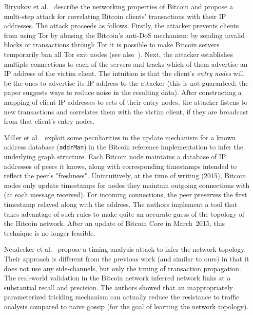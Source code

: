 Biryukov et al.~\cite{Biryukov2014} describe the networking properties of Bitcoin and propose a multi-step attack for correlating Bitcoin clients' transactions with their IP addresses.
The attack proceeds as follows.
Firstly, the attacker prevents clients from using Tor by abusing the Bitcoin's anti-DoS mechanism: by sending invalid blocks or transactions through Tor it is possible to make Bitcoin servers temporarily ban all Tor exit nodes (see also~\cite{Biryukov2015}).
Next, the attacker establishes multiple connections to each of the servers and tracks which of them advertise an IP address of the victim client.
The intuition is that the client's \textit{entry nodes} will be the ones to advertise its IP address to the attacker (this is not guaranteed; the paper suggests ways to reduce noise in the resulting data).
After constructing a mapping of client IP addresses to sets of their entry nodes, the attacker listens to new transactions and correlates them with the victim client, if they are broadcast from that client's entry nodes.

Miller et al.~\cite{Miller2015} exploit some peculiarities in the update mechanism for a known address database (\texttt{addrMan}) in the Bitcoin reference implementation to infer the underlying graph structure.
Each Bitcoin node maintains a  database of IP addresses of peers it knows, along with corresponding timestamps intended to reflect the peer's "freshness".
Unintuitively, at the time of writing (2015), Bitcoin nodes only update timestamps for nodes they maintain outgoing connections with (at each message received).
For incoming connections, the peer preserves the first timestamp relayed along with the address.
The authors implement a tool that takes advantage of such rules to make quite an accurate guess of the topology of the Bitcoin network.
After an update of Bitcoin Core in March~2015, this technique is no longer feasible.

Neudecker et al.~\cite{Neudecker2016} propose a timing analysis attack to infer the network topology.
Their approach is different from the previous work (and similar to ours) in that it does not use any side-channels, but only the timing of transaction propagation.
The real-world validation in the Bitcoin network inferred network links at a substantial recall and precision.
The authors showed that an inappropriately parameterized trickling mechanism can actually reduce the resistance to traffic analysis compared to na{\"i}ve gossip (for the goal of learning the network topology).

